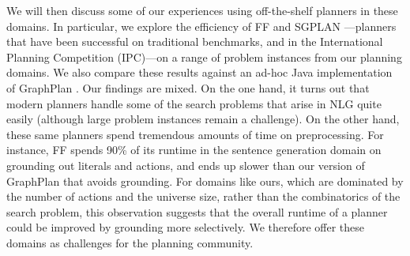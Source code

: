 We will then discuss some of our experiences using off-the-shelf planners
in these domains. In particular, we explore the efficiency of FF
\cite{HoffmannNebel01} and SGPLAN
\cite{hsu06:_new_featur_in_sgplan_for}---planners that have been successful
on traditional benchmarks, and in the International Planning Competition
(IPC)---on a range of problem instances from our planning domains.  We also
compare these results against an ad-hoc Java implementation of GraphPlan
\cite{Blum1997}.  Our findings are mixed. On the one hand, it turns out
that modern planners handle some of the search problems that arise in NLG
quite easily (although large problem instances remain a challenge). On the
other hand, these same planners spend tremendous amounts of time on
preprocessing. For instance, FF spends 90\% of its runtime in the sentence
generation domain on grounding out literals and actions, and ends up slower
than our version of GraphPlan that avoids grounding. For domains like ours,
which are dominated by the number of actions and the universe size, rather
than the combinatorics of the search problem, this observation suggests
that the overall runtime of a planner could be improved by grounding more
selectively. We therefore offer these domains as challenges for the
planning community.




